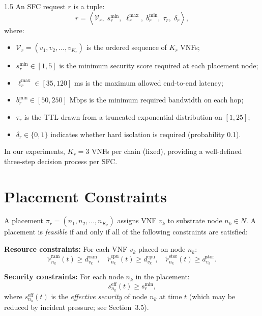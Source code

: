 \documentclass[A4paper,12pt]{report}
\theoremstyle{plain}
\theoremstyle{definition}
\theoremstyle{remark}
\numberwithin{equation}{section}
\begin{document}
\begin{spacing}{1.5}
An SFC request $r$ is a tuple:
\begin{equation}
r = \left\langle \mathcal{V}_r,\; s_r^{\min},\; \ell_r^{\max},\; b_r^{\min},\; \tau_r,\; \delta_r \right\rangle,
\end{equation}
where:
\begin{itemize}
  \item $\mathcal{V}_r = (v_1, v_2, \ldots, v_{K_r})$ is the ordered sequence of $K_r$ VNFs;
  \item $s_r^{\min} \in [1, 5]$ is the minimum security score required at each placement node;
  \item $\ell_r^{\max} \in [35, 120]$ ms is the maximum allowed end-to-end latency;
  \item $b_r^{\min} \in [50, 250]$ Mbps is the minimum required bandwidth on each hop;
  \item $\tau_r$ is the TTL drawn from a truncated exponential distribution on $[1, 25]$;
  \item $\delta_r \in \{0,1\}$ indicates whether hard isolation is required (probability 0.1).
\end{itemize}

In our experiments, $K_r = 3$ VNFs per chain (fixed), providing a well-defined three-step decision process per SFC.

\section{Placement Constraints}

A placement $\pi_r = (n_1, n_2, \ldots, n_{K_r})$ assigns VNF $v_k$ to substrate node $n_k \in N$. A placement is \textit{feasible} if and only if all of the following constraints are satisfied:

\textbf{Resource constraints:} For each VNF $v_k$ placed on node $n_k$:
\begin{equation}
\tilde{r}_{n_k}^{\text{ram}}(t) \geq d_{v_k}^{\text{ram}}, \quad
\tilde{r}_{n_k}^{\text{cpu}}(t) \geq d_{v_k}^{\text{cpu}}, \quad
\tilde{r}_{n_k}^{\text{stor}}(t) \geq d_{v_k}^{\text{stor}}.
\end{equation}

\textbf{Security constraints:} For each node $n_k$ in the placement:
\begin{equation}
s_{n_k}^{\text{eff}}(t) \geq s_r^{\min},
\end{equation}
where $s_{n_k}^{\text{eff}}(t)$ is the \textit{effective security} of node $n_k$ at time $t$ (which may be reduced by incident pressure; see Section~3.5).


\end{spacing}
\end{document}
